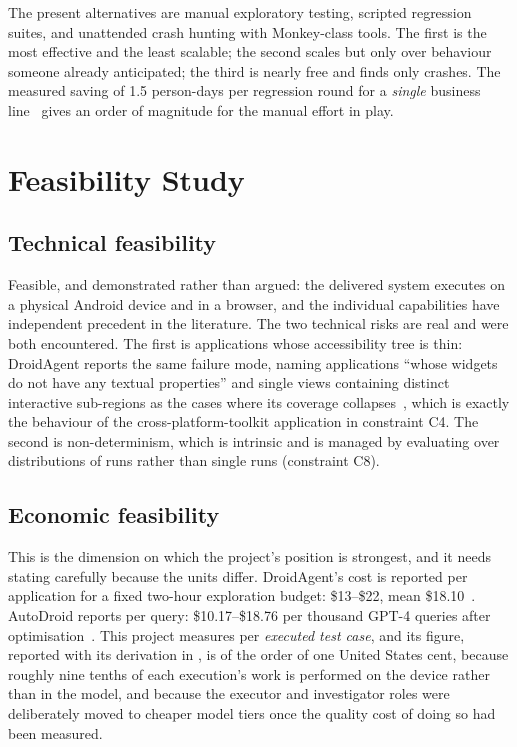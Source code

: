 The present alternatives are manual exploratory testing, scripted regression
suites, and unattended crash hunting with Monkey-class tools. The first is the
most effective and the least scalable; the second scales but only over
behaviour someone already anticipated; the third is nearly free and finds only
crashes. The measured saving of 1.5 person-days per regression round for a
\emph{single} business line~\cite{auitestagent} gives an order of magnitude for
the manual effort in play.


\section{Feasibility Study}
\label{sec:feasibility}

\subsection*{Technical feasibility}

Feasible, and demonstrated rather than argued: the delivered system executes on
a physical Android device and in a browser, and the individual capabilities
have independent precedent in the literature. The two technical risks are real
and were both encountered. The first is applications whose accessibility tree
is thin: DroidAgent reports the same failure mode, naming applications ``whose
widgets do not have any textual properties'' and single views containing
distinct interactive sub-regions as the cases where its coverage
collapses~\cite{droidagent}, which is exactly the behaviour of the
cross-platform-toolkit application in constraint C4. The second is
non-determinism, which is intrinsic and is managed by evaluating over
distributions of runs rather than single runs (constraint C8).

\subsection*{Economic feasibility}

This is the dimension on which the project's position is strongest, and it
needs stating carefully because the units differ. DroidAgent's cost is reported
per application for a fixed two-hour exploration budget: \$13--\$22, mean
\$18.10~\cite{droidagent}. AutoDroid reports per query: \$10.17--\$18.76 per
thousand GPT-4 queries after optimisation~\cite{autodroid}. This project
measures per \emph{executed test case}, and its figure, reported with its
derivation in , is of the order of one United States cent,
because roughly nine tenths of each execution's work is performed on the device
rather than in the model, and because the executor and investigator roles were
deliberately moved to cheaper model tiers once the quality cost of doing so had
been measured.


